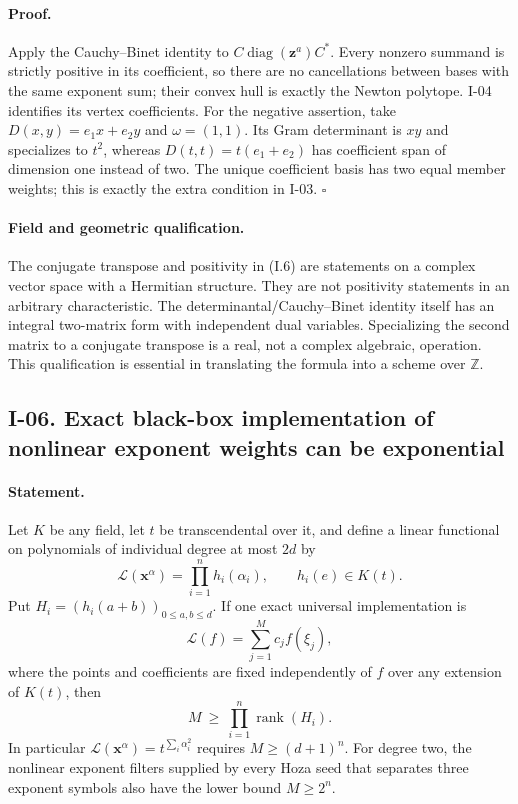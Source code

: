 \documentclass[11pt,a4paper]{article}
\theoremstyle{definition}\newtheorem{definition}{Definition}
\begin{document}
\paragraph{Proof.}
Apply the Cauchy--Binet identity to
$C\operatorname{diag}(\mathbf z^a)C^*$.
Every nonzero summand is strictly positive in its coefficient, so
there are no cancellations between bases with the same exponent
sum; their convex hull is exactly the Newton polytope.  I-04
identifies its vertex coefficients.  For the negative assertion,
take $D(x,y)=e_1x+e_2y$ and $\omega=(1,1)$.  Its Gram determinant
is $xy$ and specializes to $t^2$, whereas
$D(t,t)=t(e_1+e_2)$ has coefficient span of dimension one instead
of two.  The unique coefficient basis has two equal member weights;
this is exactly the extra condition in I-03. \hfill$\square$

\paragraph{Field and geometric qualification.}
The conjugate transpose and positivity in (I.6) are statements on
a complex vector space with a Hermitian structure.  They are not
positivity statements in an arbitrary characteristic.  The
determinantal/Cauchy--Binet identity itself has an integral
two-matrix form with independent dual variables.  Specializing the
second matrix to a conjugate transpose is a real, not a complex
algebraic, operation.  This qualification is essential in translating
the formula into a scheme over $\mathbb Z$.

\subsection{I-06. Exact black-box implementation of nonlinear exponent weights can be exponential}
\label{I-06}

\paragraph{Statement.}
Let $K$ be any field, let $t$ be transcendental over it, and define
a linear functional on polynomials of individual degree at most $2d$
by
\[
 \mathcal L(\mathbf x^\alpha)=\prod_{i=1}^n h_i(\alpha_i),
 \qquad h_i(e)\in K(t).
\]
Put $H_i=(h_i(a+b))_{0\le a,b\le d}$.
If one exact universal implementation is
\[
 \mathcal L(f)=\sum_{j=1}^M c_j f(\xi_j),
\tag{I.7}
\]
where the points and coefficients are fixed independently of $f$
over any extension of $K(t)$, then
\[
 M\ \ge\ \prod_{i=1}^n\operatorname{rank}(H_i).
\tag{I.8}
\]
In particular $\mathcal L(\mathbf x^\alpha)=
t^{\sum_i\alpha_i^2}$ requires $M\ge(d+1)^n$.
For degree two, the nonlinear exponent filters supplied by every
Hoza seed that separates three exponent symbols also have the
lower bound $M\ge2^n$.
\end{document}
